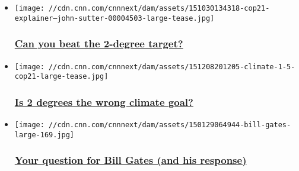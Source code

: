 \begin{itemize}
\item
  \href{http://cnn.it/1SWNcEi}{}

  \texttt{[image: //cdn.cnn.com/cnnnext/dam/assets/151030134318-cop21-explainer---john-sutter-00004503-large-tease.jpg]}

  \hypertarget{can-you-beat-the-2-degree-target}{%
  \subsubsection{\texorpdfstring{\href{http://cnn.it/1SWNcEi}{Can you
  beat the 2-degree
  target?}}{Can you beat the 2-degree target?}}\label{can-you-beat-the-2-degree-target}}
\item
  \href{/2015/12/08/opinions/sutter-1-5-degrees-climate-cop21/index.html}{}

  \texttt{[image: //cdn.cnn.com/cnnnext/dam/assets/151208201205-climate-1-5-cop21-large-tease.jpg]}

  \hypertarget{is-2-degrees-the-wrong-climate-goal}{%
  \subsubsection{\texorpdfstring{\href{/2015/12/08/opinions/sutter-1-5-degrees-climate-cop21/index.html}{Is
  2 degrees the wrong climate
  goal?}}{Is 2 degrees the wrong climate goal?}}\label{is-2-degrees-the-wrong-climate-goal}}
\item
  \href{/2015/12/03/opinions/sutter-bill-gates-paris-cop21/index.html}{}

  \texttt{[image: //cdn.cnn.com/cnnnext/dam/assets/150129064944-bill-gates-large-169.jpg]}

  \hypertarget{your-question-for-bill-gates-and-his-response}{%
  \subsubsection{\texorpdfstring{\href{/2015/12/03/opinions/sutter-bill-gates-paris-cop21/index.html}{Your
  question for Bill Gates (and his
  response)}}{Your question for Bill Gates (and his response)}}\label{your-question-for-bill-gates-and-his-response}}
\end{itemize}

